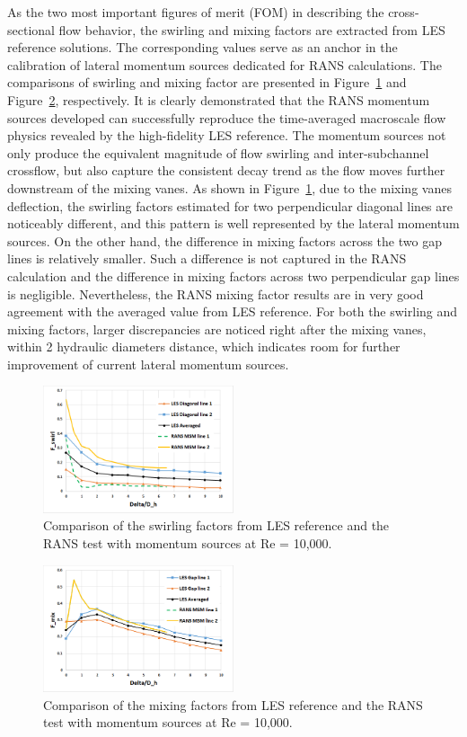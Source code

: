 As the two most important figures of merit (FOM) in describing the cross-sectional flow behavior, the swirling and mixing factors are extracted from LES reference solutions.
The corresponding values serve as an anchor in the calibration of lateral momentum sources dedicated for RANS calculations.
The comparisons of swirling and mixing factor are presented in Figure~\ref{fig:fswirl} and Figure~\ref{fig:fmix}, respectively.
It is clearly demonstrated that the RANS momentum sources developed can successfully reproduce the time-averaged macroscale flow physics revealed by the high-fidelity LES reference.
The momentum sources not only produce the equivalent magnitude of flow swirling and inter-subchannel crossflow, but also capture the consistent decay trend as the flow moves further downstream of the mixing vanes.
As shown in Figure~\ref{fig:fswirl}, due to the mixing vanes deflection, the swirling factors estimated for two perpendicular diagonal lines are noticeably different, and this pattern is well represented by the lateral momentum sources.
On the other hand, the difference in mixing factors across the two gap lines is relatively smaller. Such a difference is not captured in the RANS calculation and the difference in mixing factors across two perpendicular gap lines is negligible.
Nevertheless, the RANS mixing factor results are in very good agreement with the averaged value from LES reference. For both the swirling and mixing factors, larger discrepancies are noticed right after the mixing vanes, within 2 hydraulic diameters distance, which indicates room for further improvement of current lateral momentum sources.

\begin{figure}[!ht]
\centering
\includegraphics[width=0.5\textwidth]{./figures/Results_swirling_factor.png}
\caption{Comparison of the swirling factors from LES reference and the RANS test with momentum sources at Re = 10,000. }
\label{fig:fswirl}
\end{figure}

\begin{figure}[!ht]
\centering
\includegraphics[width=0.5\textwidth]{./figures/Results_mixing_factor.png}
\caption{Comparison of the mixing factors from LES reference and the RANS test with momentum sources at Re = 10,000. }
\label{fig:fmix}
\end{figure}

